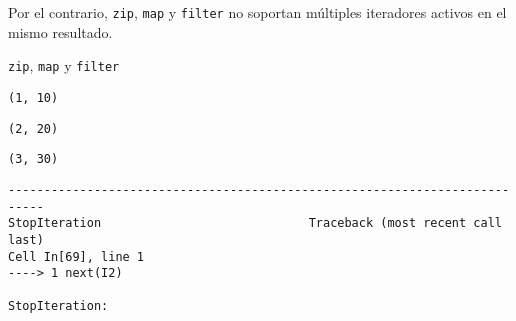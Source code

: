 Por el contrario, \texttt{zip}, \texttt{map} y \texttt{filter} no
soportan múltiples iteradores activos en el mismo resultado.

\begin{code} \texttt{zip}, \texttt{map} y \texttt{filter}
\begin{Shaded}
\begin{Highlighting}[]
\OperatorTok{=} \NormalTok{((}\NormalTok{, }\NormalTok{, }\NormalTok{), (}\NormalTok{, }\NormalTok{, }\NormalTok{))}
\OperatorTok{=} 
\OperatorTok{=} 
\end{Highlighting}
\end{Shaded}

\begin{Shaded}
\begin{Highlighting}[]
\end{Highlighting}
\end{Shaded}

\begin{verbatim}
(1, 10)
\end{verbatim}

\begin{Shaded}
\begin{Highlighting}[]
\end{Highlighting}
\end{Shaded}

\begin{verbatim}
(2, 20)
\end{verbatim}

\begin{Shaded}
\begin{Highlighting}[]
\end{Highlighting}
\end{Shaded}

\begin{verbatim}
(3, 30)
\end{verbatim}

\begin{Shaded}
\begin{Highlighting}[]
\end{Highlighting}
\end{Shaded}

\begin{verbatim}
---------------------------------------------------------------------------
StopIteration                             Traceback (most recent call last)
Cell In[69], line 1
----> 1 next(I2)

StopIteration: 
\end{verbatim}
\end{code}

